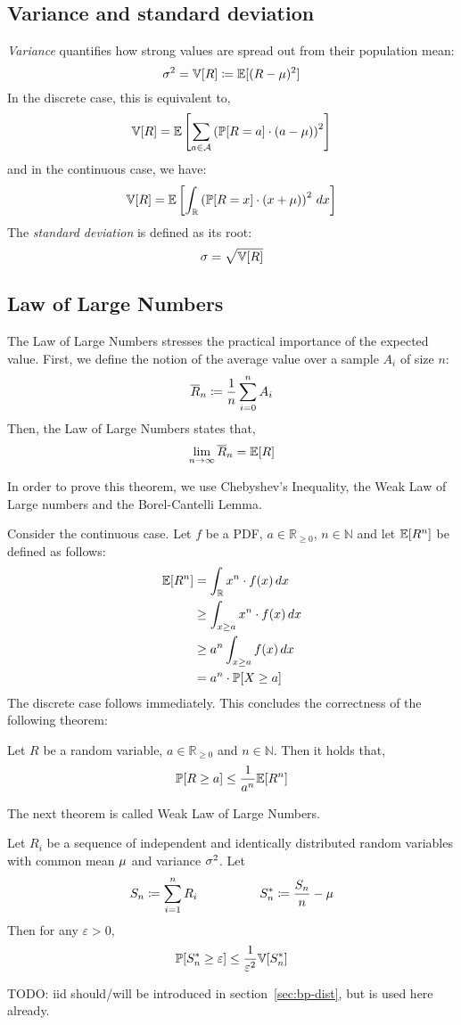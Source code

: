 \subsection{Variance and standard deviation}
\label{sec:bp-var-sd}
%
\emph{Variance} quantifies how strong values are spread out from their population mean:
\[ \sigma^2 = \mathbb V[R] \coloneqq \mathbb E[(R - \mu)^2] \]
In the discrete case, this is equivalent to,
\[ \mathbb V[R] = \mathbb E\left[\sum_{a \in \mathcal A} \left(\mathbb P[R=a] \cdot (a - \mu)\right)^2\right] \]
and in the continuous case, we have:
\[ \mathbb V[R] = \mathbb E\left[\int_{\mathbb R} \left(\mathbb P[R=x] \cdot (x + \mu)\right)^2 \, dx\right] \]
The \emph{standard deviation} is defined as its root:
\[ \sigma = \sqrt{\mathbb V[R]} \]

\subsection{Law of Large Numbers}
\label{sec:bp-lln}
%
The Law of Large Numbers stresses the practical importance of the expected value.
First, we define the notion of the average value over a sample $A_i$ of size $n$:
\[ \overline{R}_n \coloneqq \frac1n \sum_{i=0}^n A_i \]
Then, the Law of Large Numbers states that,
\[ \lim_{n\to\infty} \overline{R}_n = \mathbb E[R] \]

In order to prove this theorem, we use Chebyshev's Inequality, the Weak Law of Large numbers
and the Borel-Cantelli Lemma.

Consider the continuous case. Let $f$ be a PDF, $a \in \mathbb R_{\geq 0}$, $n \in \mathbb N$ and let $\mathbb E[R^n]$ be defined as follows:
\begin{align*}
  \mathbb E[R^n] &= \int_{\mathbb R} x^n \cdot f(x) \, dx \\
          &\geq \int_{x \geq a} x^n \cdot f(x) \, dx \\
          &\geq a^n \int_{x \geq a} f(x) \, dx \\
          &= a^n \cdot \mathbb P[X \geq a]
\end{align*}
The discrete case follows immediately.
This concludes the correctness of the following theorem:
\begin{theorem}
  Let $R$ be a random variable, $a \in \mathbb R_{\geq 0}$ and $n \in \mathbb N$. Then it holds that,
  \[ \mathbb P[R \geq a] \leq \frac{1}{a^n} \mathbb E[R^n] \]
\end{theorem}

The next theorem is called Weak Law of Large Numbers.
\begin{theorem}
  Let $R_i$ be a sequence of independent and identically distributed random variables
  with common mean $\mu$ and variance $\sigma^2$. Let
  \[
      S_n \coloneqq \sum_{i=1}^n R_i \hspace{50pt}
      S_n^* \coloneqq \frac{S_n}{n} - \mu
  \]
  Then for any $\varepsilon > 0$,
  \[ \mathbb P[S_n^* \geq \varepsilon] \leq \frac{1}{\varepsilon^2} \mathbb V[S^*_n] \]

  TODO: iid should/will be introduced in section~\ref{sec:bp-dist}, but is used here already.
\end{theorem}

